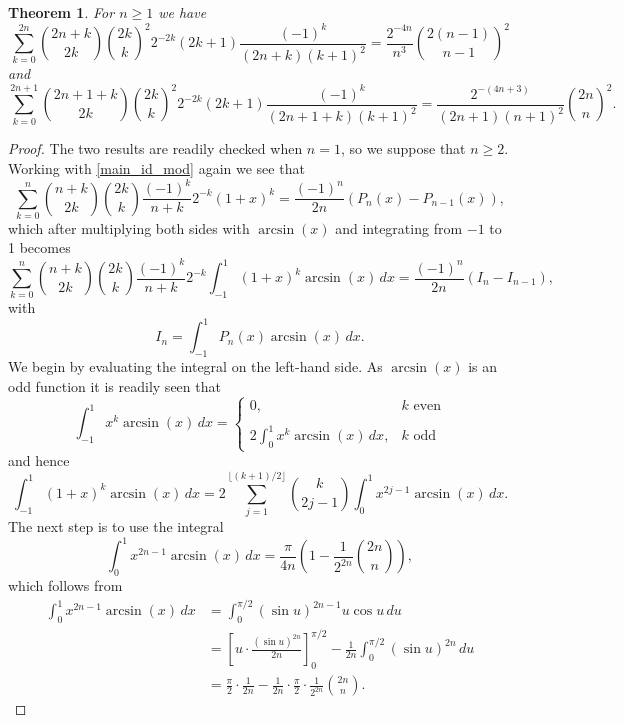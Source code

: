 \documentclass[11pt,reqno]{amsart}
\theoremstyle{plain}
\numberwithin{equation}{section}
\newtheorem{theorem}[thm]{Theorem}
\begin{document}
\begin{theorem}\label{arcsin_thm}
For $n\geq 1$ we have
\begin{equation}
\sum_{k=0}^{2n} \binom{2n+k}{2k} \binom{2k}{k}^2 2^{-2k} (2k+1) \frac{(-1)^k}{(2n+k)(k+1)^2} = \frac{2^{-4n}}{n^3} \binom{2(n-1)}{n-1}^2
\end{equation}
and
\begin{equation}
\sum_{k=0}^{2n+1} \binom{2n+1+k}{2k} \binom{2k}{k}^2 2^{-2k} (2k+1) \frac{(-1)^k}{(2n+1+k)(k+1)^2} 
= \frac{2^{-(4n+3)}}{(2n+1)(n+1)^2} \binom{2n}{n}^2.
\end{equation}
\end{theorem}
\begin{proof}
The two results are readily checked when $n=1$, so we suppose that $n\ge 2$.\\  
Working with \eqref{main_id_mod} again we see that
$$\sum_{k=0}^n \binom{n+k}{2k} \binom{2k}{k} \frac{(-1)^k}{n+k} 2^{-k} (1+x)^k = \frac{(-1)^n}{2n} \left ( P_n(x) - P_{n-1}(x)\right ),$$
which after multiplying both sides with $\arcsin(x)$ and integrating from $-1$ to 1 becomes
$$\sum_{k=0}^n \binom{n+k}{2k} \binom{2k}{k} \frac{(-1)^k}{n+k} 2^{-k} \int_{-1}^1 (1+x)^k\arcsin(x)\,dx 
= \frac{(-1)^n}{2n} \left ( I_n - I_{n-1}\right ),$$
with
$$I_n = \int_{-1}^1 P_n(x) \arcsin(x)\,dx.$$
We begin by evaluating the integral on the left-hand side. As $\arcsin(x)$ is an odd function it is readily seen that
\begin{equation*}
\int_{-1}^1 x^k\arcsin(x)\,dx = \begin{cases}
0, & k \,\,\text{even} \\ 
 &  \\
2 \int_{0}^1 x^k\arcsin(x)\,dx, & k \,\,\text{odd}
\end{cases} 
\end{equation*}
and hence
$$\int_{-1}^1 (1+x)^k\arcsin(x)\,dx = 2 \sum_{j=1}^{\lfloor (k+1)/2 \rfloor } \binom{k}{2j-1} \int_{0}^1 x^{2j-1} \arcsin(x)\,dx.$$
The next step is to use the integral
$$\int_{0}^1 x^{2n-1} \arcsin(x)\,dx = \frac{\pi}{4n}\left ( 1 - \frac{1}{2^{2n}}\binom{2n}{n} \right ),$$
which follows from
\begin{align*}
\int_0^1 x^{2n-1} \arcsin(x)\,dx &=\int_0^{\pi/2}(\sin u)^{2n-1}u\cos u\,du\\
&=\left[u\cdot\frac{(\sin u)^{2n}}{2n}\right]_0^{\pi/2}-\frac{1}{2n}\int_0^{\pi/2}(\sin u)^{2n}\,du\\
&=\frac{\pi}{2}\cdot\frac{1}{2n}-\frac{1}{2n}\cdot\frac{\pi}{2}\cdot \frac{1}{2^{2n}}\binom{2n}{n}.
\end{align*}

\end{proof}
\end{document}
